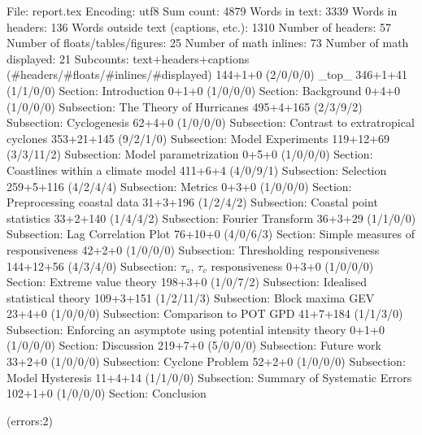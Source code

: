 
File: report.tex
Encoding: utf8
Sum count: 4879
Words in text: 3339
Words in headers: 136
Words outside text (captions, etc.): 1310
Number of headers: 57
Number of floats/tables/figures: 25
Number of math inlines: 73
Number of math displayed: 21
Subcounts:
  text+headers+captions (#headers/#floats/#inlines/#displayed)
  144+1+0 (2/0/0/0) _top_
  346+1+41 (1/1/0/0) Section: Introduction
  0+1+0 (1/0/0/0) Section: Background
  0+4+0 (1/0/0/0) Subsection: The Theory of Hurricanes
  495+4+165 (2/3/9/2) Subsection: Cyclogenesis
  62+4+0 (1/0/0/0) Subsection: Contrast to extratropical cyclones
  353+21+145 (9/2/1/0) Subsection: Model Experiments
  119+12+69 (3/3/11/2) Subsection: Model parametrization
  0+5+0 (1/0/0/0) Section: Coastlines within a climate model
  411+6+4 (4/0/9/1) Subsection: Selection
  259+5+116 (4/2/4/4) Subsection: Metrics
  0+3+0 (1/0/0/0) Section: Preprocessing coastal data
  31+3+196 (1/2/4/2) Subsection: Coastal point statistics
  33+2+140 (1/4/4/2) Subsection: Fourier Transform
  36+3+29 (1/1/0/0) Subsection: Lag Correlation Plot
  76+10+0 (4/0/6/3) Section: Simple measures of responsiveness
  42+2+0 (1/0/0/0) Subsection: Thresholding responsiveness
  144+12+56 (4/3/4/0) Subsection: $\tau_u$, $\tau_v$ responsiveness
  0+3+0 (1/0/0/0) Section: Extreme value theory
  198+3+0 (1/0/7/2) Subsection: Idealised statistical theory
  109+3+151 (1/2/11/3) Subsection: Block maxima GEV
  23+4+0 (1/0/0/0) Subsection: Comparison to POT GPD
  41+7+184 (1/1/3/0) Subsection: Enforcing an asymptote using potential intensity theory 
  0+1+0 (1/0/0/0) Section: Discussion
  219+7+0 (5/0/0/0) Subsection: Future work
  33+2+0 (1/0/0/0) Subsection: Cyclone Problem
  52+2+0 (1/0/0/0) Subsection: Model Hysteresis
  11+4+14 (1/1/0/0) Subsection: Summary of Systematic Errors
  102+1+0 (1/0/0/0) Section: Conclusion

(errors:2)
